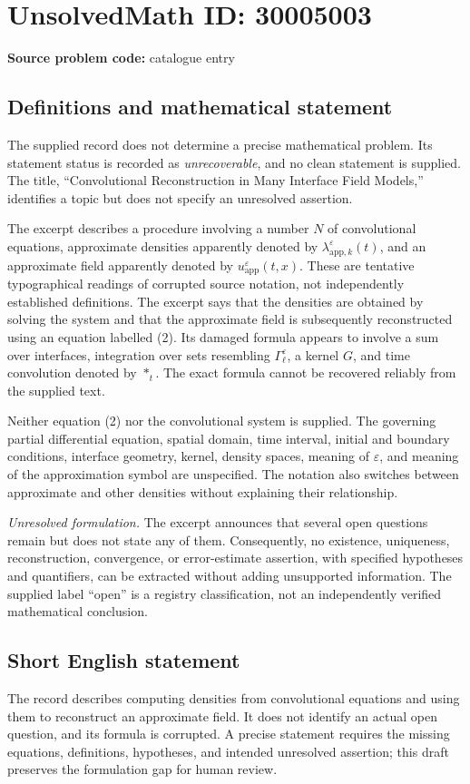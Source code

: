 \documentclass[11pt]{article}
\begin{document}
\section*{UnsolvedMath ID: 30005003}
\textbf{Source problem code:} catalogue entry
\subsection{Definitions and mathematical statement}
The supplied record does not determine a precise mathematical problem. Its statement status is recorded as \emph{unrecoverable}, and no clean statement is supplied. The title, ``Convolutional Reconstruction in Many Interface Field Models,'' identifies a topic but does not specify an unresolved assertion.

The excerpt describes a procedure involving a number \(N\) of convolutional equations, approximate densities apparently denoted by \(\lambda^{\varepsilon}_{\mathrm{app},k}(t)\), and an approximate field apparently denoted by \(u^{\varepsilon}_{\mathrm{app}}(t,x)\). These are tentative typographical readings of corrupted source notation, not independently established definitions. The excerpt says that the densities are obtained by solving the system and that the approximate field is subsequently reconstructed using an equation labelled (2). Its damaged formula appears to involve a sum over interfaces, integration over sets resembling \(\Gamma^{\varepsilon}_{\ell}\), a kernel \(G\), and time convolution denoted by \(*_t\). The exact formula cannot be recovered reliably from the supplied text.

Neither equation (2) nor the convolutional system is supplied. The governing partial differential equation, spatial domain, time interval, initial and boundary conditions, interface geometry, kernel, density spaces, meaning of \(\varepsilon\), and meaning of the approximation symbol are unspecified. The notation also switches between approximate and other densities without explaining their relationship.

\emph{Unresolved formulation.} The excerpt announces that several open questions remain but does not state any of them. Consequently, no existence, uniqueness, reconstruction, convergence, or error-estimate assertion, with specified hypotheses and quantifiers, can be extracted without adding unsupported information. The supplied label ``open'' is a registry classification, not an independently verified mathematical conclusion.
\subsection{Short English statement}
The record describes computing densities from convolutional equations and using them to reconstruct an approximate field. It does not identify an actual open question, and its formula is corrupted. A precise statement requires the missing equations, definitions, hypotheses, and intended unresolved assertion; this draft preserves the formulation gap for human review.
\end{document}

